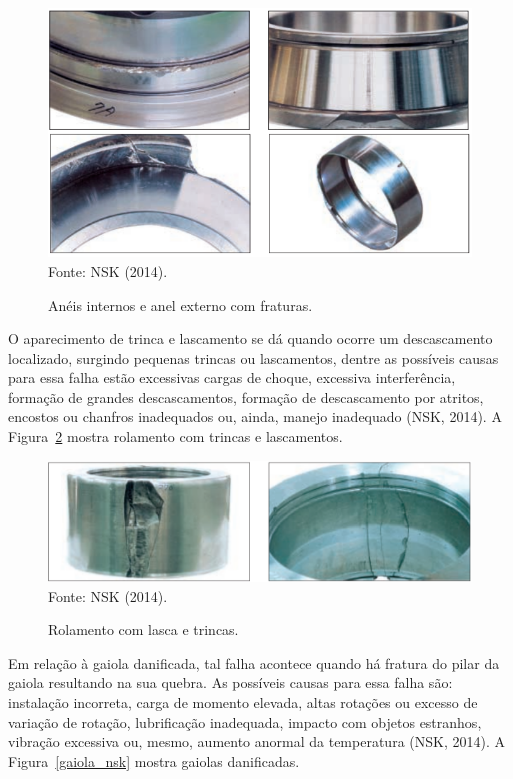 \documentclass[
	12pt,				
	oneside,			
	a4paper,			
	english,			
	brazil,			
	]{abntex2ppgsi}
\begin{document}
\begin{figure}[H]
\centering
\caption {Anéis internos e anel externo com fraturas.}
\includegraphics[width=\textwidth,height=\textheight,keepaspectratio]{fraturas_nsk} \\
Fonte: NSK (2014).
\label{fraturas_nsk}
\end{figure}

O aparecimento de trinca e lascamento se dá quando ocorre um descascamento localizado, surgindo pequenas trincas ou lascamentos, dentre as possíveis causas para essa falha estão excessivas cargas de choque, excessiva interferência, formação de grandes descascamentos, formação de descascamento por atritos, encostos ou chanfros inadequados ou, ainda, manejo inadequado (NSK, 2014). A Figura~\ref{trinca_nsk} mostra rolamento com trincas e lascamentos. 

\begin{figure}[H]
\centering
\caption {Rolamento com lasca e trincas.}
\includegraphics[width=\textwidth,height=\textheight,keepaspectratio]{trinca_nsk} \\
Fonte: NSK (2014).
\label{trinca_nsk}
\end{figure}

Em relação à gaiola danificada, tal falha acontece quando há fratura do pilar da gaiola resultando na sua quebra. As possíveis causas para essa falha são: instalação incorreta, carga de momento elevada, altas rotações ou excesso de variação de rotação, lubrificação inadequada, impacto com objetos estranhos, vibração excessiva ou, mesmo, aumento anormal da temperatura (NSK, 2014). A Figura~\ref{gaiola_nsk} mostra gaiolas danificadas. 
\end{document}
